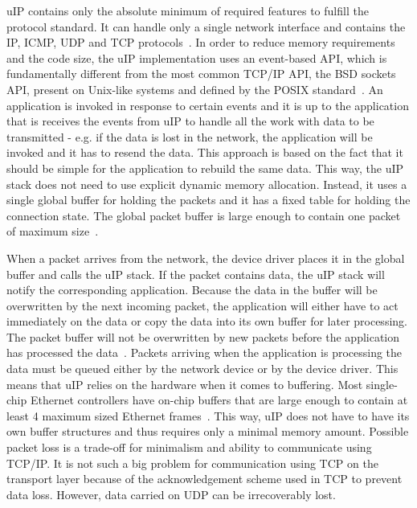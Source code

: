 uIP contains only the absolute minimum of required features to fulfill the protocol standard.
It can handle only a single network interface and contains the IP, ICMP, UDP and TCP protocols~\cite{contiki-docs}. %
In order to reduce memory requirements and the code size, %
the uIP implementation uses an event-based API, which is fundamentally different
from the most common TCP/IP API, the BSD sockets API, present on Unix-like systems
and defined by the POSIX standard~\cite{thesis-programming,posix}.
An application is invoked in response to certain events and
it is up to the application that is receives the events from uIP to handle all the
work with data to be transmitted - e.g. if the data is lost in the network, %
the application will be invoked and it has to resend the data.
This approach is based on the fact that it should be simple for the application
to rebuild the same data.
This way, the uIP stack does not need to use explicit dynamic memory allocation.
Instead, it uses a single global buffer for holding the packets and it has a fixed
table for holding the connection state.
The global packet buffer is large enough to contain one packet of maximum size~\cite{contiki-docs}. %

When a packet arrives from the network, the device driver places it in the
global buffer and calls the uIP stack.
If the packet contains data, the uIP stack will notify the corresponding application. %
Because the data in the buffer will be overwritten by the next incoming packet, %
the application will either have to act immediately on the data or copy the data into %
its own buffer for later processing.
The packet buffer will not be overwritten by new packets before the application has processed the data~\cite{contiki-docs}. %
Packets arriving when the application is processing the data must be queued
either by the network device or by the device driver.
This means that uIP relies on the hardware when it comes to buffering.
Most single-chip Ethernet controllers have on-chip buffers
that are large enough to contain at least 4 maximum sized Ethernet frames~\cite{contiki-docs}. %
This way, uIP does not have to have its own buffer structures and thus requires only a minimal memory amount. %
Possible packet loss is a trade-off for minimalism and ability to communicate using TCP/IP. %
It is not such a big problem for communication using TCP on the transport layer
because of the acknowledgement scheme used in TCP to prevent data loss.
However, data carried on UDP can be irrecoverably lost.

